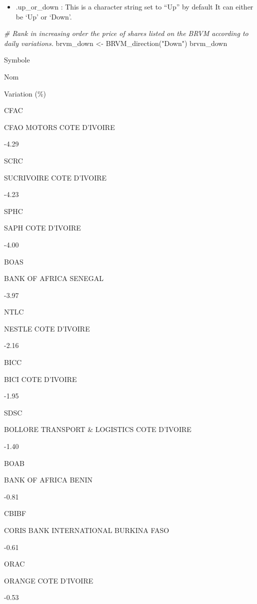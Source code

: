 \documentclass[
]{article}
\newenvironment{Shaded}{\begin{snugshade}}{\end{snugshade}}
\newcommand{\CommentTok}[1]{\textcolor[rgb]{0.56,0.35,0.01}{\textit{#1}}}
\newcommand{\FunctionTok}[1]{\textcolor[rgb]{0.00,0.00,0.00}{#1}}
\newcommand{\NormalTok}[1]{#1}
\newcommand{\OtherTok}[1]{\textcolor[rgb]{0.56,0.35,0.01}{#1}}
\newcommand{\StringTok}[1]{\textcolor[rgb]{0.31,0.60,0.02}{#1}}
\providecommand{\tightlist}{%
  \setlength{\itemsep}{0pt}\setlength{\parskip}{0pt}}
\begin{document}
\begin{itemize}
\tightlist
\item
  .up\_or\_down : This is a character string set to ``Up'' by default It
  can either be `Up' or `Down'.
\end{itemize}

\begin{Shaded}
\begin{Highlighting}[]

\CommentTok{\# Rank in increasing order the price of shares listed on the BRVM according to daily variations.}
\NormalTok{brvm\_down }\OtherTok{\textless{}{-}} \FunctionTok{BRVM\_direction}\NormalTok{(}\StringTok{"Down"}\NormalTok{)}
\NormalTok{brvm\_down}
\end{Highlighting}
\end{Shaded}

Symbole

Nom

Variation (\%)

CFAC

CFAO MOTORS COTE D'IVOIRE

-4.29

SCRC

SUCRIVOIRE COTE D'IVOIRE

-4.23

SPHC

SAPH COTE D'IVOIRE

-4.00

BOAS

BANK OF AFRICA SENEGAL

-3.97

NTLC

NESTLE COTE D'IVOIRE

-2.16

BICC

BICI COTE D'IVOIRE

-1.95

SDSC

BOLLORE TRANSPORT \& LOGISTICS COTE D'IVOIRE

-1.40

BOAB

BANK OF AFRICA BENIN

-0.81

CBIBF

CORIS BANK INTERNATIONAL BURKINA FASO

-0.61

ORAC

ORANGE COTE D'IVOIRE

-0.53
\end{document}
